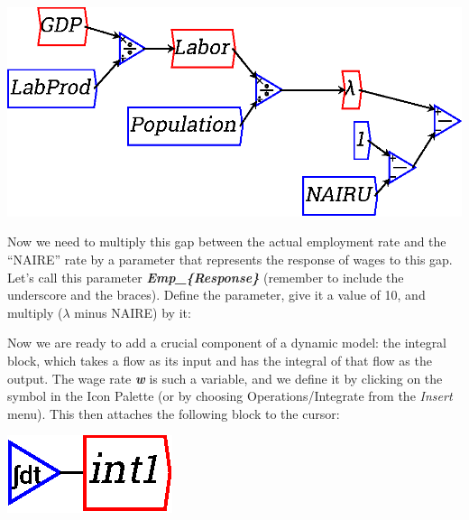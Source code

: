 \begin{center}
  \includegraphics{images/NewItem108.eps}
\end{center}

Now we need to multiply this gap between the actual employment rate
and the ``NAIRE'' rate by a parameter that represents the response of
wages to this gap. Let's call this parameter {\bf\em Emp\_\{Response\}} (remember to include the underscore and the braces). Define the parameter, give it a value of 10, and multiply ($\lambda$ minus NAIRE) by it:

\begin{center}
\end{center}

Now we are ready to add a crucial component of a dynamic model: the
integral block, which takes a flow as its input and has the integral
of that flow as the output. The wage rate {\bf\em w} is such a variable, and we
define it by clicking on the  symbol in the Icon Palette (or by
choosing Operations/Integrate from the {\em Insert} menu). This then attaches the
following block to the cursor: 

\begin{center}
\includegraphics{images/NewItem39.eps}
\end{center}


